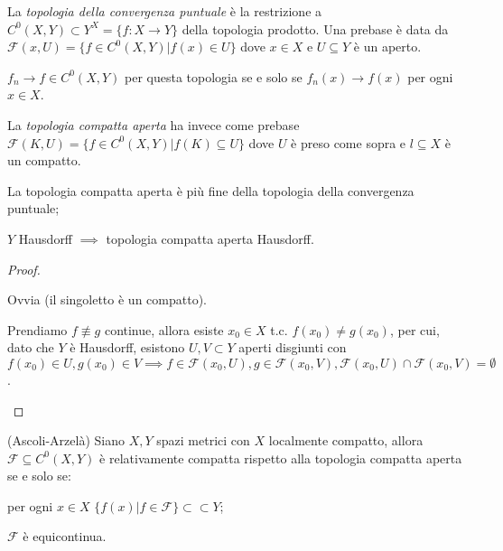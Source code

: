 La \textit{topologia della convergenza puntuale} è la restrizione a $C^0(X, Y) \subset Y^X=\{f:X \rightarrow Y\}$ della topologia prodotto. Una prebase è data da $\mathcal{F}(x, U)=\{f \in C^0(X, Y) |f(x) \in U\}$ dove $x \in X$ e $U \subseteq Y$ è un aperto.

\begin{exc}
  $f_n \rightarrow f \in C^0(X, Y)$ per questa topologia se e solo se $f_n(x) \rightarrow f(x)$ per ogni $x \in X$.
\end{exc}

La \textit{topologia compatta aperta} ha invece come prebase $\mathcal{F}(K, U)=\{f \in C^0(X, Y) | f(K) \subseteq U\}$ dove $U$ è preso come sopra e $l \subseteq X$ è un compatto.

\begin{prop}
  \begin{nlist}
    \item La topologia compatta aperta è più fine della topologia della convergenza puntuale;
    \item $Y$ Hausdorff $\implies$ topologia compatta aperta Hausdorff.
  \end{nlist}
\end{prop}

\begin{proof}
  \begin{nlist}
    \item Ovvia (il singoletto è un compatto).
    \item Prendiamo $f \not\equiv g$ continue, allora esiste $x_0 \in X$ t.c. $f(x_0) \not= g(x_0)$, per cui, dato che $Y$ è Hausdorff,
    esistono $U, V \subset Y$ aperti disgiunti con $f(x_0) \in U, g(x_0) \in V \implies f \in \mathcal{F}(x_0, U), g \in \mathcal{F}(x_0, V), \mathcal{F}(x_0, U) \cap \mathcal{F}(x_0, V)=\emptyset$.
  \end{nlist}
\end{proof}

\begin{thm}
  (Ascoli-Arzelà) Siano $X, Y$ spazi metrici con $X$ localmente compatto, allora $\mathcal{F} \subseteq C^0(X, Y)$ è relativamente compatta rispetto alla topologia compatta aperta se e solo se:
  \begin{nlist}
    \item per ogni $x \in X$ $\{f(x) | f \in \mathcal{F}\} \subset \subset Y$;
    \item $\mathcal{F}$ è equicontinua.
  \end{nlist}
\end{thm}

